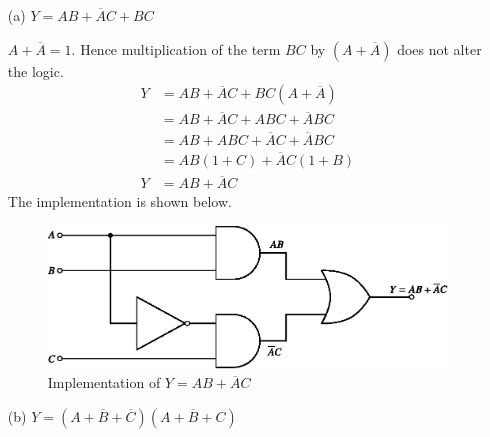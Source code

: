 \smallskip
\begin{solution}
\begin{itemize}
\item[(a)] $Y=AB+\overline{A}C+BC$

$A+\overline{A}=1$. Hence multiplication of the term $BC$ by $(A+\overline{A})$ does not alter the logic.
\begin{align*}
Y &= AB+\overline{A}C+BC(A+\overline{A})\\[6pt]
  &= AB+\overline{A}C+ABC+\overline{A}BC\\[6pt]
  &= AB+ABC+\overline{A}C+\overline{A}BC\\[6pt]
  &= AB(1+C)+\overline{A}C(1+B)\\[6pt]
Y &= AB+\overline{A}C
\end{align*}
The implementation is shown below.
\begin{figure}[H]
\centering
\includegraphics{chap6/fig112.eps}
\caption*{Implementation of $Y=AB+\overline{A}C$}
\end{figure}

\eject

\item[(b)] $Y=(A+\overline{B}+\overline{C})(A+\overline{B}+C)$


\end{itemize}
\end{solution}
